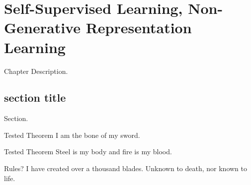 \chapter{Self-Supervised Learning, Non-Generative Representation Learning}
Chapter Description.
\section{section title}
Section.
\begin{ln-theorem}{Tested Theorem}{}
    I am the bone of my sword.
\end{ln-theorem}
\begin{ln-define}{Tested Theorem}{}
    Steel is my body and fire is my blood.
\end{ln-define}
\begin{ln-quest}{Rules?}{}
    I have created over a thousand blades.
    \tcblower
    Unknown to death, nor known to life.
\end{ln-quest}